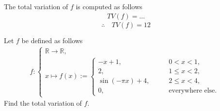\documentclass[12pt]{article}
\begin{document}
The total variation of $f$ is computed as follows
\begin{equation}
	\begin{aligned}
		TV(f)  = \dots
	\end{aligned}
\end{equation}
\newline
\newline
\newline
\newline
\newline
\newline
\newline
\newline
\newline
\begin{equation}
	\therefore\quad
	\boxed{
		TV(f) = 12
	}
\end{equation}
\begin{example}
	Let $f$ be defined as follows
	\begin{align}
		f:
		\begin{cases}
			\mathbb{R} \rightarrow \mathbb{R}, \\
			x \mapsto
			f(x) := 
			\begin{cases}
				-x+1, \quad           & \quad  0<x<1,                 \\
				2, \quad              & \quad  1\leq x < 2,           \\
				\sin(-\pi x)+4, \quad & \quad  2\leq x < 4,           \\
				0, \quad              & \quad \text{everywhere else}.
			\end{cases}
		\end{cases}
	\end{align}
	Find the total variation of $f$.
\end{example}
\end{document}

